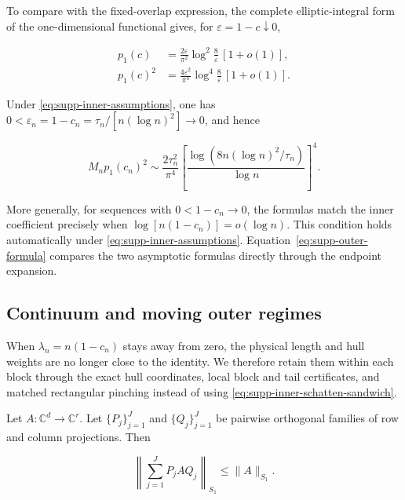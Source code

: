 To compare with the fixed-overlap expression, the complete elliptic-integral
form of the one-dimensional functional gives, for
\(\varepsilon=1-c\downarrow0\),

\begin{align}
 p_1(c)
 &=\frac{2\varepsilon}{\pi^2}
 \log^2\!\frac8\varepsilon\,[1+o(1)],
 \label{eq:supp-p1-endpoint}\\
 p_1(c)^2
 &=\frac{4\varepsilon^2}{\pi^4}
 \log^4\!\frac8\varepsilon\,[1+o(1)].
 \label{eq:supp-p1-square-endpoint}
\end{align}

Under \eqref{eq:supp-inner-assumptions}, one has
\(0<\varepsilon_n=1-c_n=\tau_n/[n(\log n)^2]\to0\), and hence

\begin{equation}\label{eq:supp-outer-formula}
 M_np_1(c_n)^2
 \sim\frac{2\tau_n^2}{\pi^4}
 \left[\frac{\log(8n(\log n)^2/\tau_n)}{\log n}\right]^4.
\end{equation}

More generally, for sequences with \(0<1-c_n\to0\), the formulas match the
inner coefficient precisely when
\(\log[n(1-c_n)]=o(\log n)\). This condition holds automatically under
\eqref{eq:supp-inner-assumptions}. Equation~\eqref{eq:supp-outer-formula}
compares the two asymptotic formulas directly through the endpoint expansion.

\subsection{Continuum and moving outer regimes}

When \(\lambda_n=n(1-c_n)\) stays away from zero, the physical length and hull
weights are no longer close to the identity. We therefore retain them within
each block through the exact hull coordinates, local block and tail
certificates, and matched rectangular pinching instead of using
\eqref{eq:supp-inner-schatten-sandwich}.

\begin{lemma}
\label{lem:supp-weighted-rectangular-pinching}
Let \(A:\mathbb C^d\to\mathbb C^r\).  Let
\(\{P_j\}_{j=1}^J\) and \(\{Q_j\}_{j=1}^J\) be pairwise orthogonal
families of row and column projections.  Then

\[
 \left\|\sum_{j=1}^J P_jAQ_j\right\|_{S_1}
 \le\|A\|_{S_1}.
\]
\end{lemma}

